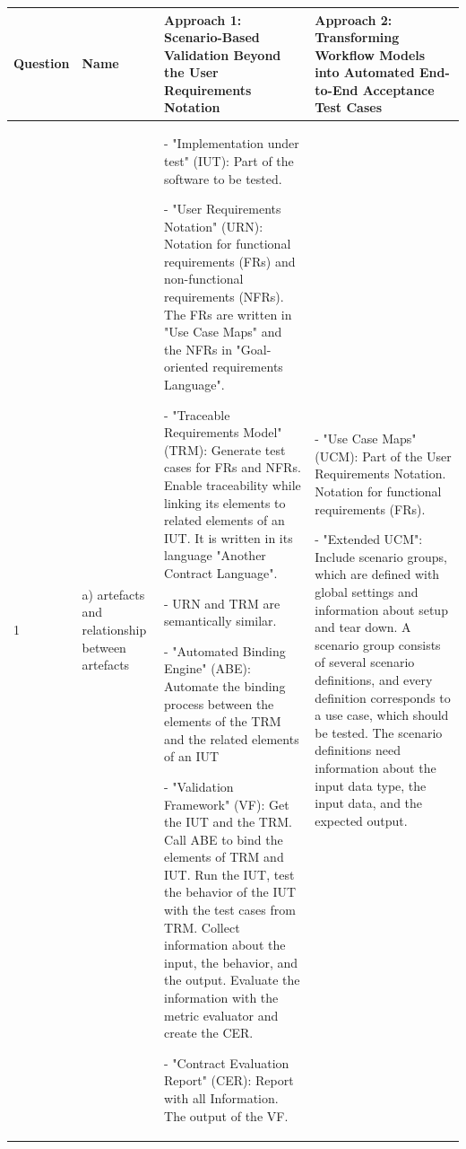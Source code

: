 \newpage
{}
\begin{landscape}
	\begin{table}
		\caption{Synthesis Matrix part 1/2.}
		\begin{longtable}[h]{|p{1.3cm}|>{\raggedright}p{2.8cm}|>{}p{9.1cm}|>{}p{9.1cm}|}
			\hline
			Question 
			& Name 
			& Approach 1: \textbf{Scenario-Based Validation Beyond the User Requirements Notation} 
			& Approach 2: \textbf{Transforming Workflow Models into Automated End-to-End Acceptance Test Cases}\\ \hline
			\multirow{3}{*}{1 \rotatebox[origin=r]{90}{\textbf{Description}}} 
			& a) artefacts and relationship between artefacts 
			&- "Implementation under test" (IUT): Part of the software to be tested. 
			
			- "User Requirements Notation" (URN): Notation for functional requirements (FRs) and non-functional requirements (NFRs). The FRs are written in "Use Case Maps" and the NFRs in "Goal-oriented requirements Language".
			
			- "Traceable Requirements Model" (TRM): Generate test cases for FRs and NFRs. Enable traceability while linking its elements to related elements of an IUT. It is written in its language "Another Contract Language". 
			
			- URN and TRM are semantically similar.
			
			- "Automated Binding Engine" (ABE): Automate the binding process between the elements of the TRM and the related elements of an IUT
			
			- "Validation Framework" (VF): Get the IUT and the TRM. Call ABE to bind the elements of TRM and IUT. Run the IUT, test the behavior of the IUT with the test cases from TRM. Collect information about the input, the behavior, and the output. Evaluate the information with the metric evaluator and create the CER.
			
			- "Contract Evaluation Report" (CER): Report with all Information. The output of the VF.
			&- "Use Case Maps" (UCM): Part of the User Requirements Notation. Notation for functional requirements (FRs).
			
			- "Extended UCM": Include scenario groups, which are defined with global settings and information about setup and tear down. A scenario group consists of several scenario definitions, and every definition corresponds to a use case, which should be tested. The scenario definitions need information about the input data type, the input data, and the expected output.
			

\end{longtable}
\end{table}
\end{landscape}
